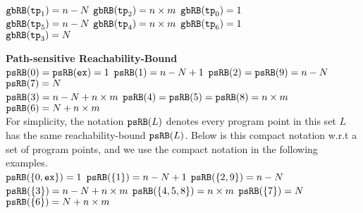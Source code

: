 \begin{enumerate}
{\begin{itemize}
  $\mathtt{gbRB}(\mathtt{tp}_1) = n - N$ \quad
  $\mathtt{gbRB}(\mathtt{tp}_2) = n \times m$ \quad
  $\mathtt{gbRB}(\mathtt{tp}_0) = 1$ 
  \\
  $\mathtt{gbRB}(\mathtt{tp}_5) = n - N$ \quad
  $\mathtt{gbRB}(\mathtt{tp}_4) = n \times m$ \quad
  $\mathtt{gbRB}(\mathtt{tp}_6) = 1$ 
  \\
  $\mathtt{gbRB}(\mathtt{tp}_3) = N$ \quad
\end{itemize}
\item \textbf{Path-sensitive Reachability-Bound}
\\
$\mathtt{psRB}(0) = \mathtt{psRB}(\mathtt{ex}) = 1$ \quad
$\mathtt{psRB}(1) = n - N + 1$ \quad
$\mathtt{psRB}(2) = \mathtt{psRB}(9) = n - N$ \quad
$\mathtt{psRB}(7) = N$
\\
$\mathtt{psRB}(3) = n - N + n \times m$ \quad
$\mathtt{psRB}(4) = \mathtt{psRB}(5) = \mathtt{psRB}(8) = n \times m$ \quad
$\mathtt{psRB}(6) = N + n \times m$ 
\\
For simplicity, the notation $\mathtt{psRB}(L)$ denotes every program point in this set $L$ has the same reachability-bound $\mathtt{psRB}(L)$.
Below is this compact notation w.r.t a set of program points, and we use the compact notation in the following examples.
\\
$\mathtt{psRB}(\{0, \mathtt{ex}\}) = 1$ \quad
$\mathtt{psRB}(\{1\}) = n - N + 1$ \quad
$\mathtt{psRB}(\{2, 9\}) = n - N$ \quad
$\mathtt{psRB}(\{3\}) = n - N + n \times m$ \quad
$\mathtt{psRB}(\{4, 5, 8\}) = n \times m$ \quad
$\mathtt{psRB}(\{7\}) = N$ \quad
$\mathtt{psRB}(\{6\}) = N + n \times m$ 
}
\end{enumerate}